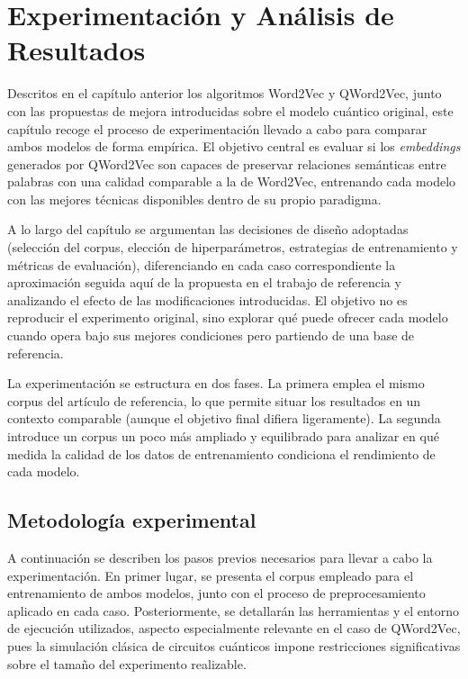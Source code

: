 \chapter{Experimentación y Análisis de Resultados}
\label{chap:experimentacion}

Descritos en el capítulo anterior los algoritmos Word2Vec y QWord2Vec, junto con las propuestas de mejora introducidas sobre el modelo cuántico original, este capítulo recoge el proceso de experimentación llevado a cabo para comparar ambos modelos de forma empírica. El objetivo central es evaluar si los \textit{embeddings} generados por QWord2Vec son capaces de preservar relaciones semánticas entre palabras con una calidad comparable a la de Word2Vec, entrenando cada modelo con las mejores técnicas disponibles dentro de su propio paradigma.

A lo largo del capítulo se argumentan las decisiones de diseño adoptadas (selección del corpus, elección de hiperparámetros, estrategias de entrenamiento y métricas de evaluación), diferenciando en cada caso correspondiente la aproximación seguida aquí de la propuesta en el trabajo de referencia \cite{ohno_qword2vec_2025} y analizando el efecto de las modificaciones introducidas. El objetivo no es reproducir el experimento original, sino explorar qué puede ofrecer cada modelo cuando opera bajo sus mejores condiciones pero partiendo de una base de referencia.

La experimentación se estructura en dos fases. La primera emplea el mismo corpus del artículo de referencia, lo que permite situar los resultados en un contexto comparable (aunque el objetivo final difiera ligeramente). La segunda introduce un corpus un poco más ampliado y equilibrado para analizar en qué medida la calidad de los datos de entrenamiento condiciona el rendimiento de cada modelo.

\section{Metodología experimental}

A continuación se describen los pasos previos necesarios para llevar a cabo la experimentación. En primer lugar, se presenta el corpus empleado para el entrenamiento de ambos modelos, junto con el proceso de preprocesamiento aplicado en cada caso. Posteriormente, se detallarán las herramientas y el entorno de ejecución utilizados, aspecto especialmente relevante en el caso de QWord2Vec, pues la simulación clásica de circuitos cuánticos impone restricciones significativas sobre el tamaño del experimento realizable.


